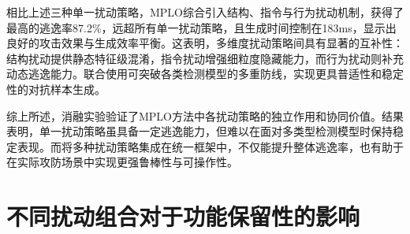 

相比上述三种单一扰动策略，MPLO综合引入结构、指令与行为扰动机制，获得了最高的逃逸率87.2\%，远超所有单一扰动策略，且生成时间控制在183ms，显示出良好的攻击效果与生成效率平衡。这表明，多维度扰动策略间具有显著的互补性：结构扰动提供静态特征级混淆，指令扰动增强细粒度隐藏能力，而行为扰动则补充动态逃逸能力。联合使用可突破各类检测模型的多重防线，实现更具普适性和稳定性的对抗样本生成。


综上所述，消融实验验证了MPLO方法中各扰动策略的独立作用和协同价值。结果表明，单一扰动策略虽具备一定逃逸能力，但难以在面对多类型检测模型时保持稳定表现。而将多种扰动策略集成在统一框架中，不仅能提升整体逃逸率，也有助于在实际攻防场景中实现更强鲁棒性与可操作性。


\section{不同扰动组合对于功能保留性的影响}

